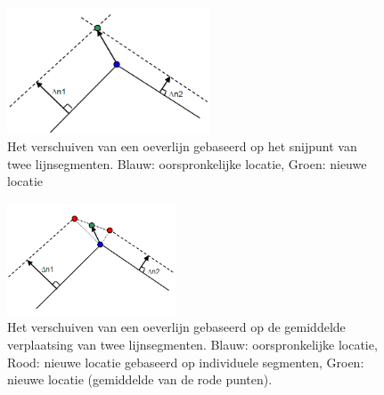 \begin{figure}[!h]
\includegraphics[width=6cm]{figures/Fig4-3.png}
\caption{Het verschuiven van een oeverlijn gebaseerd op het snijpunt van twee lijnsegmenten.
Blauw: oorspronkelijke locatie, Groen: nieuwe locatie}
\label{Fig4.3}
\end{figure}

\begin{figure}[!h]
\includegraphics[width=5cm]{figures/Fig4-4.png}
\caption{Het verschuiven van een oeverlijn gebaseerd op de gemiddelde verplaatsing van twee lijnsegmenten.
Blauw: oorspronkelijke locatie, Rood: nieuwe locatie gebaseerd op individuele segmenten, Groen: nieuwe locatie (gemiddelde van de rode punten).}
\label{Fig4.4}
\end{figure}
